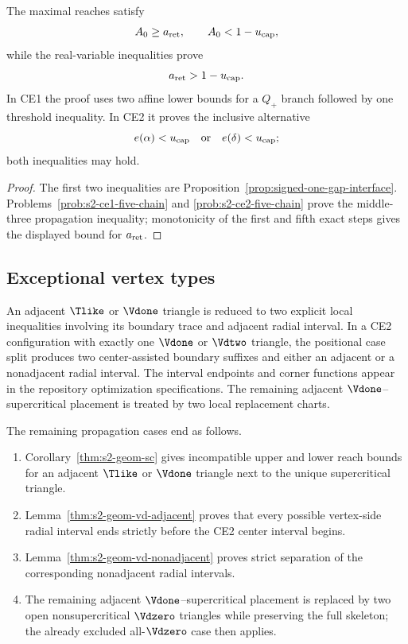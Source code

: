 \begin{proposition}
\label{prop:body-five-V-triangle-certificate}
The maximal reaches satisfy
\[
 A_0\ge a_{\rm ret},
 \qquad
 A_0<1-u_{\rm cap},
\]
while the real-variable inequalities prove
\[
 a_{\rm ret}>1-u_{\rm cap}.
\]
In CE1 the proof uses two affine lower bounds for a $Q_+$ branch followed by
one threshold inequality.  In CE2 it proves the inclusive alternative
\[
 e(\alpha)<u_{\rm cap}
 \quad\text{or}\quad
 e(\delta)<u_{\rm cap};
\]
both inequalities may hold.
\end{proposition}

\begin{proof}
The first two inequalities are Proposition~\ref{prop:signed-one-gap-interface}.
Problems~\ref{prob:s2-ce1-five-chain} and
\ref{prob:s2-ce2-five-chain} prove the middle-three propagation inequality;
monotonicity of the first and fifth exact steps gives the displayed bound for
$a_{\rm ret}$.
\end{proof}

\subsection{Exceptional vertex types}

\begin{definition}
\label{def:body-adjacent-rescuer-data}
\label{def:body-vd-residual-data}
\label{def:body-vd-replacement-data}
An adjacent $\Tlike$ or $\Vdone$ triangle is reduced to two explicit local
inequalities involving its boundary trace and adjacent radial interval.  In a
CE2 configuration with exactly one $\Vdone$ or $\Vdtwo$ triangle, the
positional case split produces two center-assisted boundary suffixes and
either an adjacent or a nonadjacent radial interval.  The interval endpoints
and corner functions appear in the repository optimization
specifications.  The remaining adjacent
$\Vdone$--supercritical placement is treated by two local replacement charts.
\end{definition}

\begin{proposition}
\label{prop:body-special-terminal-certificates}
The remaining propagation cases end as follows.
\begin{enumerate}
\item Corollary~\ref{thm:s2-geom-sc} gives incompatible upper and lower reach
bounds for an adjacent $\Tlike$ or $\Vdone$ triangle next to the unique
supercritical triangle.
\item Lemma~\ref{thm:s2-geom-vd-adjacent} proves that every possible
vertex-side radial interval ends strictly before the CE2 center interval
begins.
\item Lemma~\ref{thm:s2-geom-vd-nonadjacent} proves strict separation of the
corresponding nonadjacent radial intervals.
\item The remaining adjacent $\Vdone$--supercritical placement is replaced by
two open nonsupercritical $\Vdzero$ triangles while preserving the full
skeleton; the already excluded all-$\Vdzero$ case then applies.
\end{enumerate}
\end{proposition}

